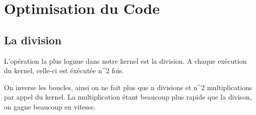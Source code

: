 \documentclass{report}
\begin{document}
\section*{Optimisation du Code}
\subsection*{La division}

L'opération la plus lognue dans notre kernel est la division. A chaque exécution du kernel, celle-ci est éxécutée n^2 fois.

On inverse les boucles, ainsi on ne fait plus que n divisions et n^2 multiplications par appel du kernel.
La multiplication étant beaucoup plus rapide que la divison, on gagne beaucoup en vitesse.
\end{document}

